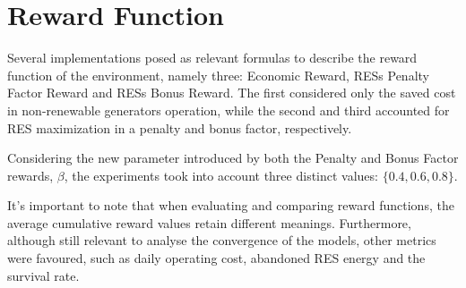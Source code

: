 \section{Reward Function} \label{sec:results-rewards}

Several implementations posed as relevant formulas to describe the reward function of the environment, namely three: Economic Reward, \acp{RES} Penalty Factor Reward and \acp{RES} Bonus Reward. The first considered only the saved cost in non-renewable generators operation, while the second and third accounted for \ac{RES} maximization in a penalty and bonus factor, respectively.
\par
Considering the new parameter introduced by both the Penalty and Bonus Factor rewards, $\beta$, the experiments took into account three distinct values: $\{0.4, 0.6, 0.8\}$.  \par
It's important to note that when evaluating and comparing reward functions, the average cumulative reward values retain different meanings. Furthermore, although still relevant to analyse the convergence of the models, other metrics were favoured, such as daily operating cost, abandoned \ac{RES} energy and the survival rate. \par

